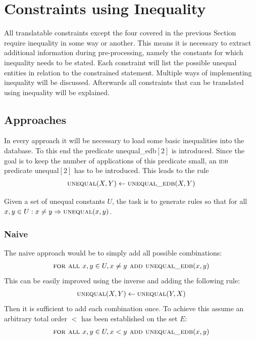 \documentclass[hyperref,bachelorofscience,fleqn]{cgvpub}
\begin{document}
\section{Constraints using Inequality}\label{sec_constraints_using_inequality}
All translatable constraints except the four covered in the previous Section require inequality in some way or another. This means it is necessary to extract additional information during pre-processing, namely the constants for which inequality needs to be stated. Each constraint will list the possible unequal entities in relation to the constrained statement. Multiple ways of implementing inequality will be discussed. Afterwards all constraints that can be translated using inequality will be explained.

\subsection{Approaches}
In every approach it will be necessary to load some basic inequalities into the database. To this end the predicate unequal\_edb\([2]\) is introduced. Since the goal is to keep the number of applications of this predicate small, an \textsc{idb} predicate unequal\([2]\) has to be introduced. This leads to the rule
\begin{align}
\textsc{unequal}(X, Y) \leftarrow \textsc{unequal\_edb}(X, Y)
\end{align}

Given a set of unequal constants \(U\), the task is to generate rules so that for all \( x, y \in U: x \ne y \Rightarrow \textsc{unequal}(x, y)\).

\subsubsection{Naive}\label{subsubsec_naive}
The naive approach would be to simply add all possible combinations:
\begin{align}
\textsc{for all } x, y \in U, x \ne y \textsc{ add } \textsc{unequal\_edb}(x, y)
\end{align}
This can be easily improved using the inverse and adding the following rule:
\begin{align}\label{equ_inverse}
\textsc{unequal}(X, Y) \leftarrow \textsc{unequal}(Y, X)
\end{align}
Then it is sufficient to add each combination once. To achieve this assume an arbitrary total order \(<\) has been established on the set \(E\):
\begin{align}
\textsc{for all } x, y \in U, x < y \textsc{ add } \textsc{unequal\_edb}(x, y)
\end{align}
\end{document}
